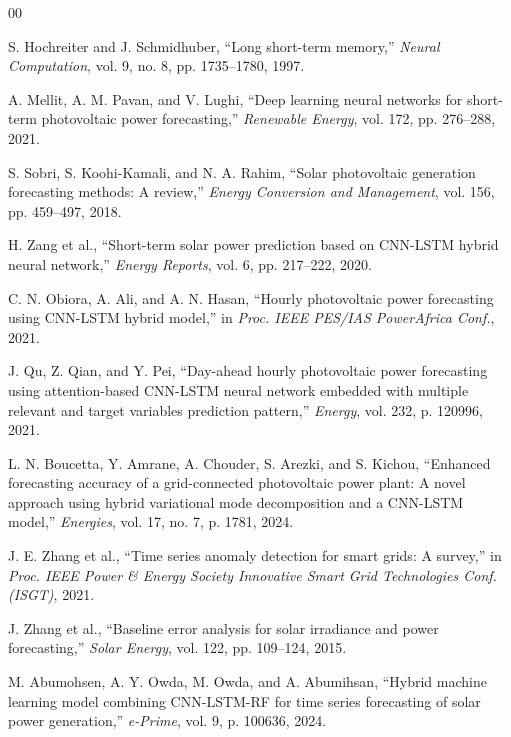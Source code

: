 \documentclass[conference]{IEEEtran}
\begin{document}
\begin{thebibliography}{00}

 S. Hochreiter and J. Schmidhuber, ``Long short-term memory,'' \textit{Neural Computation}, vol. 9, no. 8, pp. 1735--1780, 1997.

 A. Mellit, A. M. Pavan, and V. Lughi, ``Deep learning neural networks for short-term photovoltaic power forecasting,'' \textit{Renewable Energy}, vol. 172, pp. 276--288, 2021.

 S. Sobri, S. Koohi-Kamali, and N. A. Rahim, ``Solar photovoltaic generation forecasting methods: A review,'' \textit{Energy Conversion and Management}, vol. 156, pp. 459--497, 2018.

 H. Zang et al., ``Short-term solar power prediction based on CNN-LSTM hybrid neural network,'' \textit{Energy Reports}, vol. 6, pp. 217--222, 2020.

 C. N. Obiora, A. Ali, and A. N. Hasan, ``Hourly photovoltaic power forecasting using CNN-LSTM hybrid model,'' in \textit{Proc. IEEE PES/IAS PowerAfrica Conf.}, 2021.

 J. Qu, Z. Qian, and Y. Pei, ``Day-ahead hourly photovoltaic power forecasting using attention-based CNN-LSTM neural network embedded with multiple relevant and target variables prediction pattern,'' \textit{Energy}, vol. 232, p. 120996, 2021.

 L. N. Boucetta, Y. Amrane, A. Chouder, S. Arezki, and S. Kichou, ``Enhanced forecasting accuracy of a grid-connected photovoltaic power plant: A novel approach using hybrid variational mode decomposition and a CNN-LSTM model,'' \textit{Energies}, vol. 17, no. 7, p. 1781, 2024.

 J. E. Zhang et al., ``Time series anomaly detection for smart grids: A survey,'' in \textit{Proc. IEEE Power \& Energy Society Innovative Smart Grid Technologies Conf. (ISGT)}, 2021.

 J. Zhang et al., ``Baseline error analysis for solar irradiance and power forecasting,'' \textit{Solar Energy}, vol. 122, pp. 109--124, 2015.

 M. Abumohsen, A. Y. Owda, M. Owda, and A. Abumihsan, ``Hybrid machine learning model combining CNN-LSTM-RF for time series forecasting of solar power generation,'' \textit{e-Prime}, vol. 9, p. 100636, 2024.


\end{thebibliography}
\end{document}
